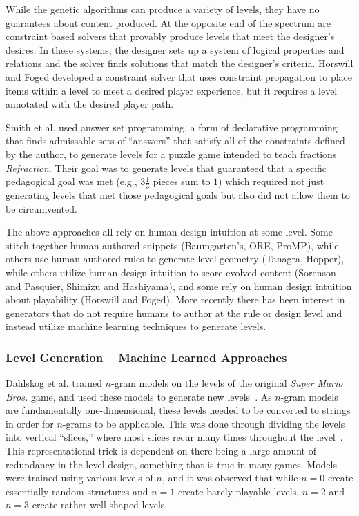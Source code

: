 \documentclass[12pt]{report}
\begin{document}
While the genetic algorithms can produce a variety of levels, they have no guarantees about content produced. At the opposite end of the spectrum are constraint based solvers that provably produce levels that meet the designer's desires. In these systems, the designer sets up a system of logical properties and relations and the solver finds solutions that match the designer's criteria.
Horswill and Foged \cite{HORSWILLCONSTRAINT} developed a constraint solver that uses constraint propagation to place items within a level to meet a desired player experience, but it requires a level annotated with the desired player path. 

Smith et al. \cite{refraction} used answer set programming, a form of declarative programming that finds admissable sets of ``answers'' that satisfy all of the constraints defined by the author, to generate levels for a puzzle game intended to teach fractions \textit{Refraction}.  Their goal was to generate levels that guaranteed that a specific pedagogical goal was met (e.g., $3 \frac{1}{3}$ pieces sum to $1$) which required not just generating levels that met those pedagogical goals but also did not allow them to be circumvented.

The above approaches all rely on human design intuition at some level.  Some stitch together human-authored snippets (Baumgarten's, ORE, ProMP), while others use human authored rules to generate level geometry (Tanagra, Hopper), while others  utilize human design intuition to score evolved content (Sorenson and Pasquier, Shimizu and Hashiyama), and some rely on human design intuition about playability (Horswill and Foged).  More recently there has been interest in generators that do not require humans to author at the rule or design level and instead utilize machine learning techniques to generate levels.

\subsubsection*{Level Generation -- Machine Learned Approaches}

Dahlskog et al. trained $n$-gram models on the levels of the original \textit{Super Mario Bros.} game, and used these models to generate new levels~\cite{dahlskog2014linear}. As $n$-gram models are fundamentally one-dimensional, these levels needed to be converted to strings in order for $n$-grams to be applicable. This was done through dividing the levels into vertical ``slices,'' where most slices recur many times throughout the level~\cite{dahlskog2013patterns}. This representational trick is dependent on there being a large amount of redundancy in the level design, something that is true in many games. Models were trained using various levels of $n$, and it was observed that while $n=0$ create essentially random structures and $n=1$ create barely playable levels, $n=2$ and $n=3$ create rather well-shaped levels.
\end{document}
